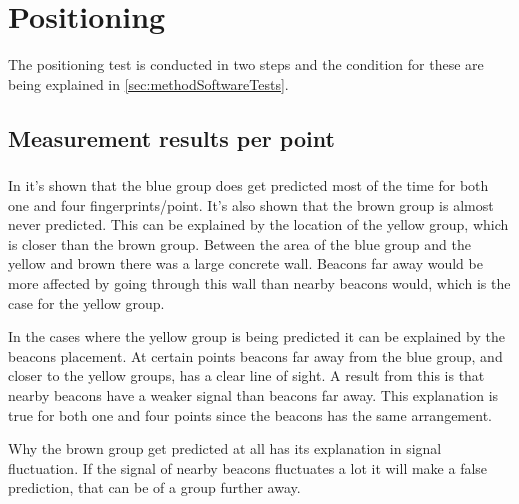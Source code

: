 \section{Positioning}\label{sec:resultPos}
The positioning test is conducted in two steps and the condition for these are being explained in \cref{sec:methodSoftwareTests}.


\subsection{Measurement results per point}\label{sec:resultsPosOneFingerprint}


\subsubsection{}\label{sec:resultsPerPointBlue}
In  it's shown that the blue group does get predicted most of the time for both one and four fingerprints/point.
It's also shown that the brown group is almost never predicted.
This can be explained by the location of the yellow group, which is closer than the brown group.
Between the area of the blue group and the yellow and brown there was a large concrete wall.
Beacons far away would be more affected by going through this wall than nearby beacons would, which is the case for the yellow group.


In the cases where the yellow group is being predicted it can be explained by the beacons placement.
At certain points beacons far away from the blue group, and closer to the yellow groups, has a clear line of sight.
A result from this is that nearby beacons have a weaker signal than beacons far away.
This explanation is true for both one and four points since the beacons has the same arrangement.

\bigskip

Why the brown group get predicted at all has its explanation in signal fluctuation.
If the signal of nearby beacons fluctuates a lot it will make a false prediction, that can be of a group further away.


